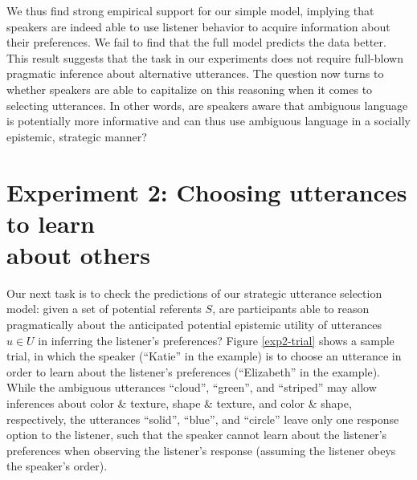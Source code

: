 \documentclass[11pt,a4paper]{article}
\begin{document}
We thus find strong empirical support for our simple model, implying that speakers are indeed able to use listener behavior to acquire information about their preferences. We fail to find that the full model predicts the data better.
This result suggests that the task in our experiments does not require full-blown pragmatic inference about alternative utterances.
The question now turns to whether speakers are able to capitalize on this reasoning when it comes to selecting utterances. In other words, are speakers aware that ambiguous language is potentially more informative and can thus use ambiguous language in a socially epistemic, strategic manner?

\section{Experiment 2: Choosing utterances to learn \\ about others} \label{experiment2}

Our next task is to check the predictions of our strategic utterance selection model: given a set of potential referents $S$, are participants able to reason pragmatically about the anticipated potential epistemic utility of utterances $u\in U$ in inferring the listener's preferences? Figure \ref{exp2-trial} shows a sample trial, in which the speaker (``Katie'' in the example) is to choose an utterance in order to learn about the listener's preferences (``Elizabeth'' in the example). While the ambiguous utterances ``cloud'', ``green'', and ``striped'' may allow inferences about color \& texture, shape \& texture, and color \& shape, respectively, the utterances ``solid'', ``blue'', and ``circle'' leave only one response option to the listener, such that the speaker cannot learn about the listener's preferences when observing the listener's response (assuming the listener obeys the speaker's order).  
\end{document}
